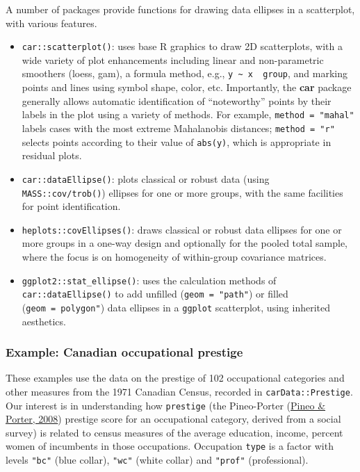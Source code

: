 \documentclass[
  letterpaper,
  10pt,
  krantz2]{krantz}
\providecommand{\tightlist}{%
  \setlength{\itemsep}{0pt}\setlength{\parskip}{0pt}}\usepackage{longtable,booktabs,array}
\begin{document}
A number of packages provide functions for drawing data ellipses in a
scatterplot, with various features.

\begin{itemize}
\tightlist
\item
  \texttt{car::scatterplot()}: uses base R graphics to draw 2D
  scatterplots, with a wide variety of plot enhancements including
  linear and non-parametric smoothers (loess, gam), a formula method,
  e.g., \texttt{y\ \textasciitilde{}\ x\ \textbar{}\ group}, and marking
  points and lines using symbol shape, color, etc. Importantly, the
  \textbf{car} package generally allows automatic identification of
  ``noteworthy'' points by their labels in the plot using a variety of
  methods. For example, \texttt{method\ =\ "mahal"} labels cases with
  the most extreme Mahalanobis distances; \texttt{method\ =\ "r"}
  selects points according to their value of \texttt{abs(y)}, which is
  appropriate in residual plots.
\item
  \texttt{car::dataEllipse()}: plots classical or robust data (using
  \texttt{MASS::cov/trob()}) ellipses for one or more groups, with the
  same facilities for point identification.
\item
  \texttt{heplots::covEllipses()}: draws classical or robust data
  ellipses for one or more groups in a one-way design and optionally for
  the pooled total sample, where the focus is on homogeneity of
  within-group covariance matrices.
\item
  \texttt{ggplot2::stat\_ellipse()}: uses the calculation methods of
  \texttt{car::dataEllipse()} to add unfilled (\texttt{geom\ =\ "path"})
  or filled (\texttt{geom\ =\ polygon"}) data ellipses in a
  \texttt{ggplot} scatterplot, using inherited aesthetics.
\end{itemize}

\hypertarget{sec-prestige}{%
\subsubsection{Example: Canadian occupational
prestige}\label{sec-prestige}}

These examples use the data on the prestige of 102 occupational
categories and other measures from the 1971 Canadian Census, recorded in
\texttt{carData::Prestige}. Our interest is in understanding how
\texttt{prestige} (the Pineo-Porter
(\protect\hyperlink{ref-PineoPorter2008}{Pineo \& Porter, 2008})
prestige score for an occupational category, derived from a social
survey) is related to census measures of the average education, income,
percent women of incumbents in those occupations. Occupation
\texttt{type} is a factor with levels \texttt{"bc"} (blue collar),
\texttt{"wc"} (white collar) and \texttt{"prof"} (professional).
\end{document}
